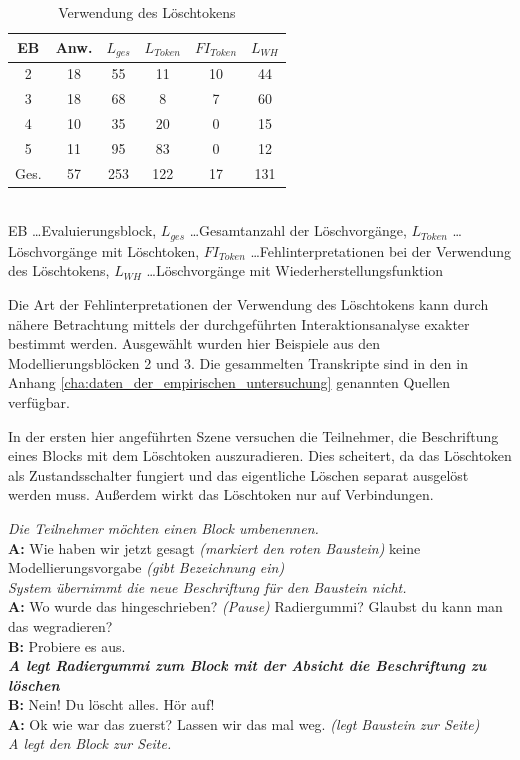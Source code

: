 \begin{table}[htbp]
	\centering
	\caption{Verwendung des Löschtokens}
\begin{tabular}{| c || c || c | c | c | c |}
  \hline
   EB    & Anw. & $L_{ges}$ & $L_{Token}$ & $FI_{Token}$ & $L_{WH}$ \\ \hline
   2     & 18 & 55 & 11 & 10 & 44 \\ 
   3     & 18 & 68 &  8 &  7 & 60 \\ 
   4     & 10 & 35 & 20 &  0 & 15 \\ 
   5     & 11 & 95 & 83 &  0 & 12 \\ \hline
   Ges.  & 57 & 253 & 122 & 17 & 131 \\ \hline
\end{tabular} \\
\footnotesize EB \ldots Evaluierungsblock, $L_{ges}$ \ldots Gesamtanzahl der Löschvorgänge, $L_{Token}$ \ldots Löschvorgänge mit Löschtoken, $FI_{Token}$ \ldots Fehlinterpretationen bei der Verwendung des Löschtokens, $L_{WH}$ \ldots Löschvorgänge mit Wiederherstellungsfunktion
	\label{tab:fehlinterpretationen}
\end{table}

Die Art der Fehlinterpretationen der Verwendung des Löschtokens kann durch nähere Betrachtung mittels der durchgeführten Interaktionsanalyse exakter bestimmt werden. Ausgewählt wurden hier Beispiele aus den Modellierungsblöcken 2 und 3. Die gesammelten Transkripte sind in den in Anhang \ref{cha:daten_der_empirischen_untersuchung} genannten Quellen verfügbar.

In der ersten hier angeführten Szene versuchen die Teilnehmer, die Beschriftung eines Blocks mit dem Löschtoken auszuradieren. Dies scheitert, da das Löschtoken als Zustandsschalter fungiert und das eigentliche Löschen separat ausgelöst werden muss. Außerdem wirkt das Löschtoken nur auf Verbindungen.

\begin{transkript}
	\emph{Die Teilnehmer möchten einen Block umbenennen.}\\
	\textbf{A:} Wie haben wir jetzt gesagt \emph{(markiert den roten Baustein)} keine Modellierungsvorgabe \emph{(gibt Bezeichnung ein)}\\
	\emph{System übernimmt die neue Beschriftung für den Baustein nicht.}\\
	\textbf{A:} Wo wurde das hingeschrieben? \emph{(Pause)} Radiergummi? Glaubst du kann man das wegradieren?\\
	\textbf{B:} Probiere es aus.\\
	\textbf{\emph{A legt Radiergummi zum Block mit der Absicht die Beschriftung zu löschen}}\\
	\textbf{B:} Nein! Du löscht alles. Hör auf! \\
	\textbf{A:} Ok wie war das zuerst? Lassen wir das mal weg. \emph{(legt Baustein zur Seite)}\\
	\emph{A legt den Block zur Seite.} 
\end{transkript}

